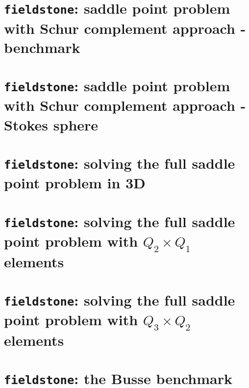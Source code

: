\documentclass[a4paper]{article}
\begin{document}
\newpage
\section{{\tt fieldstone}: saddle point problem with Schur complement approach - benchmark \label{sec_fspq1p0sc_cg}}


\newpage
\section{{\tt fieldstone}: saddle point problem with Schur complement approach - Stokes sphere \label{sec_fspq1p0sc_pcg}}


\newpage
\section{{\tt fieldstone}: solving the full saddle point problem in 3D}


\newpage
\section{{\tt fieldstone}: solving the full saddle point problem with $Q_2\times Q_1$ elements}


\newpage
\section{{\tt fieldstone}: solving the full saddle point problem with $Q_3\times Q_2$ elements}


\newpage
\section{{\tt fieldstone}: the Busse benchmark}

\end{document}
